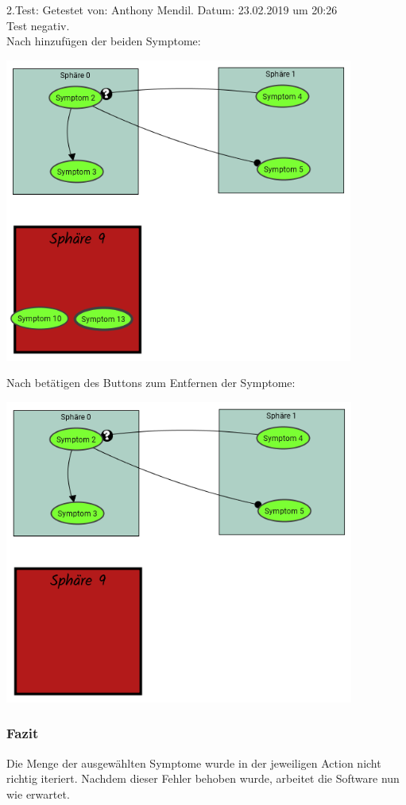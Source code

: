 \documentclass[enabledeprecatedfontcommands]{scrartcl}
\begin{document}
2.Test: Getestet von: Anthony Mendil. Datum: 23.02.2019 um 20:26 \\
Test negativ. \\
Nach hinzufügen der beiden Symptome: 
\begin{center}
\includegraphics[height=10cm]{2_22vorher.PNG}
\end{center}
Nach betätigen des Buttons zum Entfernen der Symptome: 
\begin{center}
\includegraphics[height=10cm]{2_22.PNG}
\end{center}
\subsubsection{Fazit}
Die Menge der ausgewählten Symptome wurde in der jeweiligen Action nicht richtig iteriert. Nachdem dieser Fehler behoben wurde, arbeitet die Software nun wie erwartet.
\end{document}

